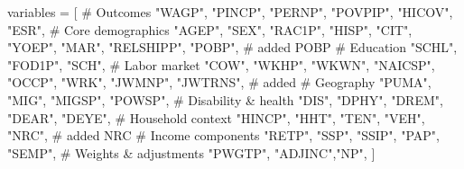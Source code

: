 \documentclass[
  letterpaper,
  DIV=11,
  numbers=noendperiod]{scrartcl}
\newenvironment{Shaded}{\begin{snugshade}}{\end{snugshade}}
\newcommand{\CommentTok}[1]{\textcolor[rgb]{0.37,0.37,0.37}{#1}}
\newcommand{\NormalTok}[1]{\textcolor[rgb]{0.00,0.23,0.31}{#1}}
\newcommand{\OtherTok}[1]{\textcolor[rgb]{0.00,0.23,0.31}{#1}}
\newcommand{\StringTok}[1]{\textcolor[rgb]{0.13,0.47,0.30}{#1}}
\begin{document}
\begin{Shaded}
\begin{Highlighting}[]
\NormalTok{variables }\OtherTok{=}\NormalTok{ [}
    \CommentTok{\# Outcomes}
    \StringTok{"WAGP"}\NormalTok{, }\StringTok{"PINCP"}\NormalTok{, }\StringTok{"PERNP"}\NormalTok{, }\StringTok{"POVPIP"}\NormalTok{, }\StringTok{"HICOV"}\NormalTok{, }\StringTok{"ESR"}\NormalTok{,}
    \CommentTok{\# Core demographics}
    \StringTok{"AGEP"}\NormalTok{, }\StringTok{"SEX"}\NormalTok{, }\StringTok{"RAC1P"}\NormalTok{, }\StringTok{"HISP"}\NormalTok{, }\StringTok{"CIT"}\NormalTok{, }\StringTok{"YOEP"}\NormalTok{, }\StringTok{"MAR"}\NormalTok{, }\StringTok{"RELSHIPP"}\NormalTok{,}
    \StringTok{"POBP"}\NormalTok{,                                                       }\CommentTok{\# added POBP}
    \CommentTok{\# Education}
    \StringTok{"SCHL"}\NormalTok{, }\StringTok{"FOD1P"}\NormalTok{, }\StringTok{"SCH"}\NormalTok{,}
    \CommentTok{\# Labor market}
    \StringTok{"COW"}\NormalTok{, }\StringTok{"WKHP"}\NormalTok{, }\StringTok{"WKWN"}\NormalTok{, }\StringTok{"NAICSP"}\NormalTok{, }\StringTok{"OCCP"}\NormalTok{, }\StringTok{"WRK"}\NormalTok{, }\StringTok{"JWMNP"}\NormalTok{, }\StringTok{"JWTRNS"}\NormalTok{, }\CommentTok{\# added}
    \CommentTok{\# Geography}
    \StringTok{"PUMA"}\NormalTok{, }\StringTok{"MIG"}\NormalTok{, }\StringTok{"MIGSP"}\NormalTok{, }\StringTok{"POWSP"}\NormalTok{,}
    \CommentTok{\# Disability \& health}
    \StringTok{"DIS"}\NormalTok{, }\StringTok{"DPHY"}\NormalTok{, }\StringTok{"DREM"}\NormalTok{, }\StringTok{"DEAR"}\NormalTok{, }\StringTok{"DEYE"}\NormalTok{,}
    \CommentTok{\# Household context}
    \StringTok{"HINCP"}\NormalTok{, }\StringTok{"HHT"}\NormalTok{, }\StringTok{"TEN"}\NormalTok{, }\StringTok{"VEH"}\NormalTok{, }\StringTok{"NRC"}\NormalTok{,                            }\CommentTok{\# added NRC}
    \CommentTok{\# Income components}
    \StringTok{"RETP"}\NormalTok{, }\StringTok{"SSP"}\NormalTok{, }\StringTok{"SSIP"}\NormalTok{, }\StringTok{"PAP"}\NormalTok{, }\StringTok{"SEMP"}\NormalTok{,}
    \CommentTok{\# Weights \& adjustments}
    \StringTok{"PWGTP"}\NormalTok{, }\StringTok{"ADJINC"}\NormalTok{,}\StringTok{"NP"}\NormalTok{,}
\NormalTok{]}


\end{Highlighting}
\end{Shaded}
\end{document}
